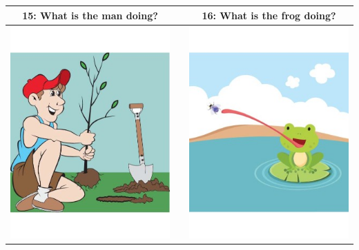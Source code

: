 \documentclass[12pt,notitlepage]{article}
\begin{document}
\begin{center}
\begin{tabular}{|c|c|c|}
\hline
15: What is the man doing? && 16: What is the frog doing? \\
\hline
\includegraphics[width=20em,trim=0 0 0 -3]{figures/I15.jpg} & & \includegraphics[width=20em,trim=0 0 0 -3]{figures/I16.jpg} \\
\hline
\end{tabular}
\vspace{1em} \\



\end{center}
\end{document}
